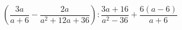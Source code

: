 \begin{ex}[type=expression]
	\begin{condition}
		\( \left(  \dfrac{3a}{a+6}-\dfrac{2a}{a^2+12a+36}\right) :\dfrac{3a+16}{a^2-36}+\dfrac{6(a-6)}{a+6}\)
	\end{condition}
\end{ex}